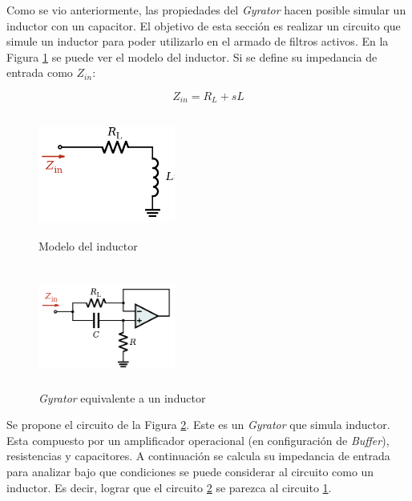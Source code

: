 \documentclass[12pt,a4paper]{article}
\begin{document}
Como se vio anteriormente, las propiedades del \textit{Gyrator} hacen posible simular un inductor con un capacitor. El objetivo de esta sección es realizar un circuito que simule un inductor para poder utilizarlo en el armado de filtros activos. 
En la Figura \ref{ej2_inductor_model} se puede ver el modelo del inductor. Si se define su impedancia de entrada como $Z_{in}$:

\begin{equation} Z_{in} = R_L + sL \label{ej2_ecua_inductor}\end{equation}

\begin{figure}[h!]                                                       
    \centering\includegraphics[width=0.4\textwidth, height=4cm]{Resources/ej2_inductor_model.png}
    \caption{Modelo del inductor}
    \label{ej2_inductor_model}
    \end{figure}


\begin{figure}[h!]                                                       
    \centering\includegraphics[width=0.4\textwidth, height=4cm]{Resources/ej2_gyrator_inductor.png}
    \caption{\textit{Gyrator} equivalente a un inductor}
    \label{ej2_gyrator_inductor}
    \end{figure}



Se propone el circuito de la Figura \ref{ej2_gyrator_inductor}. Este es un \textit{Gyrator} que simula inductor. Esta compuesto por un amplificador operacional (en configuración de \textit{Buffer}), resistencias y capacitores. A continuación se calcula su impedancia de entrada para analizar 
bajo que condiciones se puede considerar al circuito como un inductor. Es decir, lograr que el circuito \ref{ej2_gyrator_inductor} se parezca al circuito \ref{ej2_inductor_model}.
\end{document}
